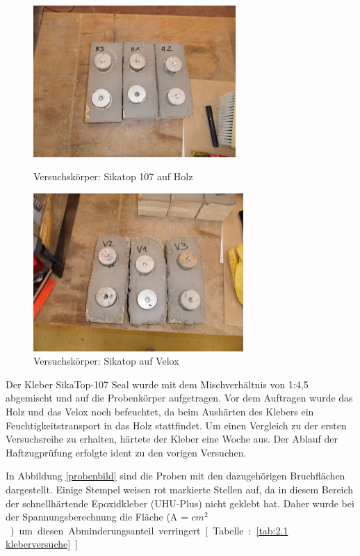 \begin{figure} 
\begin{minipage}[hbt]{7cm}	
	\includegraphics[width=7.7cm]{Verbindungsmittel/kleber/holz-kleber.jpg}
	\caption{Versuchskörper: Sikatop 107 auf Holz}
	\label{holz-kleber}
\end{minipage}
\hfill
\begin{minipage}[hbt]{7cm}
	\includegraphics[width=8cm]{Verbindungsmittel/kleber/velox-kleber.jpg}
	\caption{Versuchskörper: Sikatop auf Velox}
	\label{velox-kleber}
\end{minipage}
\end{figure}

Der Kleber SikaTop-107 Seal wurde mit dem Mischverhältnis von 1:4,5 abgemischt und auf die Probenkörper aufgetragen. Vor dem Auftragen wurde das Holz und das Velox noch befeuchtet, da beim Aushärten des Klebers ein Feuchtigkeitstransport in das Holz stattfindet. Um einen Vergleich zu der ersten Versuchsreihe zu erhalten, härtete der Kleber eine Woche aus. Der Ablauf der Haftzugprüfung erfolgte ident zu den vorigen Versuchen.

In Abbildung \ref{probenbild} sind die Proben mit den dazugehörigen Bruchflächen dargestellt. Einige Stempel weisen rot markierte Stellen auf, da in diesem Bereich der schnellhärtende Epoxidkleber (UHU-Plus) nicht geklebt hat. Daher wurde bei der Spannungsberechnung die Fläche (A = \unit[19,64]{$cm^{2}$}) um diesen Abminderungsanteil verringert. [Tabelle:\ref{tab:2.1 kleberversuche}]

